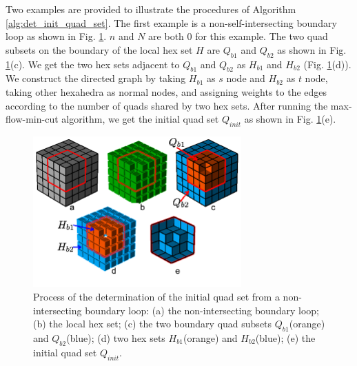 \documentclass[final,5p,times,twocolumn]{elsarticle}
\begin{document}
Two examples are provided to illustrate the procedures of Algorithm \ref{alg:det_init_quad_set}. The first example is a non-self-intersecting boundary loop as shown in Fig. \ref{fig:non_int_init_qs}. $n$ and $N$ are both 0 for this example. The two quad subsets on the boundary of the local hex set $H$ are $Q_{b1}$ and $Q_{b2}$ as shown in Fig. \ref{fig:non_int_init_qs}(c). We get the two hex sets adjacent to $Q_{b1}$ and $Q_{b2}$ as $H_{b1}$ and $H_{b2}$ (Fig. \ref{fig:non_int_init_qs}(d)). We construct the directed graph by taking $H_{b1}$ as $s$ node and $H_{b2}$ as $t$ node, taking other hexahedra as normal nodes, and assigning weights to the edges according to the number of quads shared by two hex sets. After running the max-flow-min-cut algorithm, we get the initial quad set $Q_{init}$ as shown in Fig. \ref{fig:non_int_init_qs}(e).

\begin{figure}[htbp]
\begin{center}
\includegraphics[width=8cm]{figures/non_int_init_qs.png}
\caption{Process of the determination of the initial quad set from a non-intersecting boundary loop: (a) the non-intersecting boundary loop; (b) the local hex set; (c) the two boundary quad subsets $Q_{b1}$(orange) and $Q_{b2}$(blue); (d) two hex sets $H_{b1}$(orange) and $H_{b2}$(blue); (e) the initial quad set $Q_{init}$.}
\label{fig:non_int_init_qs}
\end{center}
\end{figure}
\end{document}
